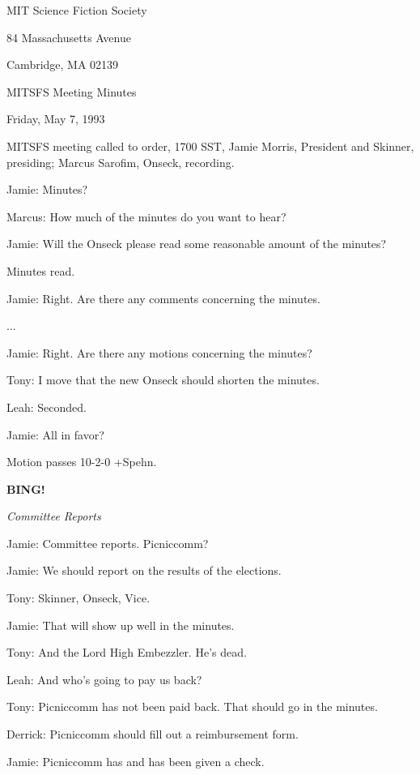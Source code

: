 \documentclass[12pt]{article}
\newcommand{\bing}{{\bf BING!} }
\newcommand{\goto}[1]{\bing \vskip 12pt \centerline{{\em{#1}}}}
\begin{document}
\begin{center}

MIT Science Fiction Society 

84 Massachusetts Avenue

Cambridge, MA 02139

\vspace{12pt}

MITSFS Meeting Minutes 

Friday, May 7, 1993

\end{center}
 
\vspace{18pt}

\setlength{\parskip}{6pt}

\noindent
MITSFS meeting called to order, 1700 SST,
Jamie Morris, President and Skinner, presiding; Marcus Sarofim, Onseck, recording.

Jamie: Minutes?

Marcus: How much of the minutes do you want to hear?

Jamie: Will the Onseck please read some reasonable amount of the minutes?

Minutes read.

Jamie: Right. Are there any comments concerning the minutes.

...

Jamie: Right. Are there any motions concerning the minutes?

Tony: I move that the new Onseck should shorten the minutes.

Leah: Seconded.

Jamie: All in favor?

Motion passes 10-2-0 +Spehn.

\goto{Committee Reports}

Jamie: Committee reports. Picniccomm?

Jamie: We should report on the results of the elections.

Tony: Skinner, Onseck, Vice.

Jamie: That will show up well in the minutes.

Tony: And the Lord High Embezzler. He's dead.

Leah: And who's going to pay us back?

Tony: Picniccomm has not been paid back. That should go in the minutes.

Derrick: Picniccomm should fill out a reimbursement form.

Jamie: Picniccomm has and has been given a check.
\end{document}
